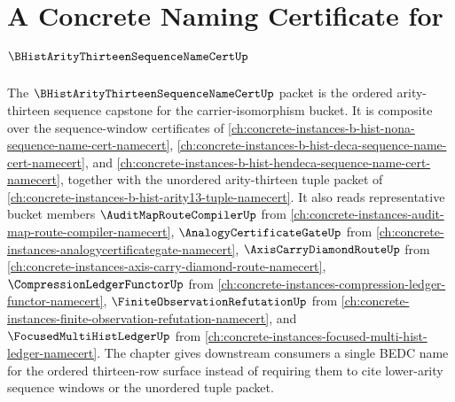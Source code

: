 \chapter{A Concrete Naming Certificate for $\BHistArityThirteenSequenceNameCertUp$}
\label{ch:concrete-instances-b-hist-arity13-sequence-name-cert-namecert}

The $\BHistArityThirteenSequenceNameCertUp$ packet is the ordered arity-thirteen sequence capstone for the carrier-isomorphism bucket. It is composite over the sequence-window certificates of \autoref{ch:concrete-instances-b-hist-nona-sequence-name-cert-namecert}, \autoref{ch:concrete-instances-b-hist-deca-sequence-name-cert-namecert}, and \autoref{ch:concrete-instances-b-hist-hendeca-sequence-name-cert-namecert}, together with the unordered arity-thirteen tuple packet of \autoref{ch:concrete-instances-b-hist-arity13-tuple-namecert}. It also reads representative bucket members $\AuditMapRouteCompilerUp$ from \autoref{ch:concrete-instances-audit-map-route-compiler-namecert}, $\AnalogyCertificateGateUp$ from \autoref{ch:concrete-instances-analogycertificategate-namecert}, $\AxisCarryDiamondRouteUp$ from \autoref{ch:concrete-instances-axis-carry-diamond-route-namecert}, $\CompressionLedgerFunctorUp$ from \autoref{ch:concrete-instances-compression-ledger-functor-namecert}, $\FiniteObservationRefutationUp$ from \autoref{ch:concrete-instances-finite-observation-refutation-namecert}, and $\FocusedMultiHistLedgerUp$ from \autoref{ch:concrete-instances-focused-multi-hist-ledger-namecert}. The chapter gives downstream consumers a single BEDC name for the ordered thirteen-row surface instead of requiring them to cite lower-arity sequence windows or the unordered tuple packet.

